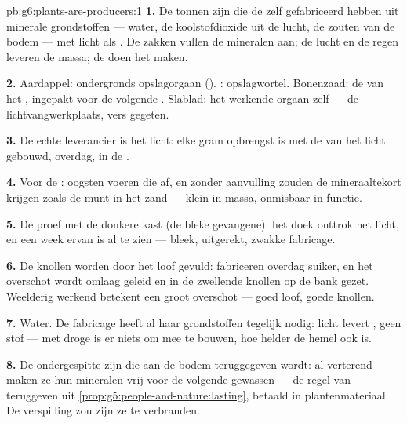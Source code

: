 \begin{solution}{pb:g6:plants-are-producers:1}
\textbf{1.} De tonnen zijn  die de  zelf
gefabriceerd hebben uit minerale grondstoffen --- water, de
koolstofdioxide uit de lucht, de zouten van de bodem --- met licht als
. De zakken vullen de mineralen aan; de lucht en de regen leveren
de massa; de  doen het maken.

\textbf{2.} Aardappel: ondergronds opslagorgaan (). :
opslagwortel. Bonenzaad: de  van het , ingepakt voor
de volgende . Slablad: het werkende orgaan zelf --- de
lichtvangwerkplaats, vers gegeten.

\textbf{3.} De echte leverancier is het licht: elke gram opbrengst is met
de  van het licht gebouwd, overdag, in de .

\textbf{4.} Voor de : oogsten voeren die af, en zonder
aanvulling zouden de  mineraaltekort krijgen zoals de munt in het
zand --- klein in massa, onmisbaar in functie.

\textbf{5.} De proef met de donkere kast (de bleke gevangene): het doek
onttrok het licht, en een week ervan is al te zien --- bleek, uitgerekt,
zwakke fabricage.

\textbf{6.} De knollen worden door het loof gevuld:  fabriceren
overdag suiker, en het overschot wordt omlaag geleid en in de zwellende
knollen op de bank gezet. Weelderig werkend  betekent een groot
overschot --- goed loof, goede knollen.

\textbf{7.} Water. De fabricage heeft al haar grondstoffen tegelijk
nodig: licht levert , geen stof --- met droge  is er niets
om mee te bouwen, hoe helder de hemel ook is.

\textbf{8.} De ondergespitte  zijn  die aan de
bodem teruggegeven wordt: al verterend maken ze hun mineralen vrij voor
de volgende gewassen --- de regel van teruggeven uit
\cref{prop:g5:people-and-nature:lasting}, betaald in plantenmateriaal.
De verspilling zou zijn ze te verbranden.


\end{solution}
